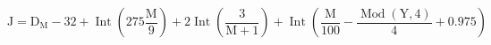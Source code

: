 \documentclass[12pt]{article}
\begin{document}
\begin{displaymath}
\mathrm{J}=\mathrm{D}_{\mathrm{M}}-32+\operatorname{Int}\left(275 \frac{\mathrm{M}}{9}\right)+2 \operatorname{Int}\left(\frac{3}{\mathrm{M}+1}\right)+\operatorname{Int}\left(\frac{\mathrm{M}}{100}-\frac{\operatorname{Mod}(\mathrm{Y}, 4)}{4}+0.975\right)
\end{displaymath}
\end{document}
